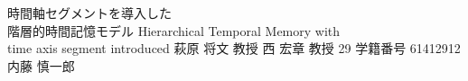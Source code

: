 \documentclass[final,a4j,12pt]{jreport}
\begin{document}
\begin{titlepage}
\thesis
{時間軸セグメントを導入した \\ 階層的時間記憶モデル}
{Hierarchical Temporal Memory with \\ time axis segment introduced}
{萩原 将文 教授}
{西 宏章 教授}
{29}
{学籍番号 61412912}
{内藤 慎一郎}
\end{titlepage}

\contents










\printbibliography[title=参考文献]

\appendix

% 
% 
% 
\end{document}
